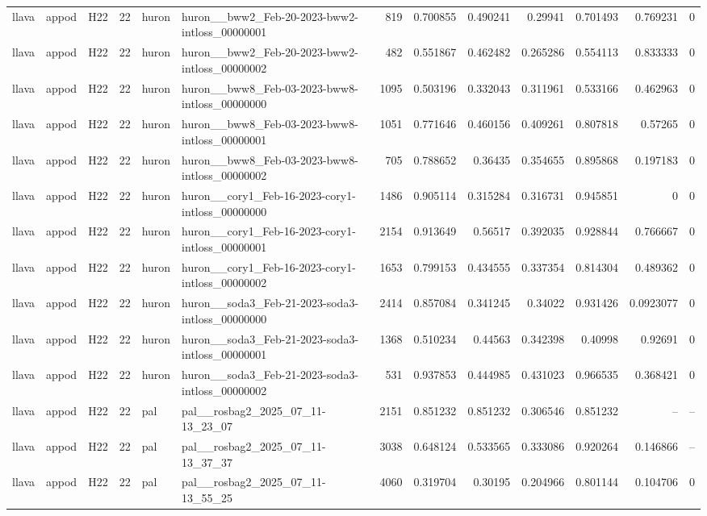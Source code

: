 \begin{longtable}{lllrllrrrrrrr}
llava & appod & H22 & 22 & huron & huron\_\_bww2\_Feb-20-2023-bww2-intloss\_00000001 & 819 & 0.700855 & 0.490241 & 0.29941 & 0.701493 & 0.769231 & 0 \\
llava & appod & H22 & 22 & huron & huron\_\_bww2\_Feb-20-2023-bww2-intloss\_00000002 & 482 & 0.551867 & 0.462482 & 0.265286 & 0.554113 & 0.833333 & 0 \\
llava & appod & H22 & 22 & huron & huron\_\_bww8\_Feb-03-2023-bww8-intloss\_00000000 & 1095 & 0.503196 & 0.332043 & 0.311961 & 0.533166 & 0.462963 & 0 \\
llava & appod & H22 & 22 & huron & huron\_\_bww8\_Feb-03-2023-bww8-intloss\_00000001 & 1051 & 0.771646 & 0.460156 & 0.409261 & 0.807818 & 0.57265 & 0 \\
llava & appod & H22 & 22 & huron & huron\_\_bww8\_Feb-03-2023-bww8-intloss\_00000002 & 705 & 0.788652 & 0.36435 & 0.354655 & 0.895868 & 0.197183 & 0 \\
llava & appod & H22 & 22 & huron & huron\_\_cory1\_Feb-16-2023-cory1-intloss\_00000000 & 1486 & 0.905114 & 0.315284 & 0.316731 & 0.945851 & 0 & 0 \\
llava & appod & H22 & 22 & huron & huron\_\_cory1\_Feb-16-2023-cory1-intloss\_00000001 & 2154 & 0.913649 & 0.56517 & 0.392035 & 0.928844 & 0.766667 & 0 \\
llava & appod & H22 & 22 & huron & huron\_\_cory1\_Feb-16-2023-cory1-intloss\_00000002 & 1653 & 0.799153 & 0.434555 & 0.337354 & 0.814304 & 0.489362 & 0 \\
llava & appod & H22 & 22 & huron & huron\_\_soda3\_Feb-21-2023-soda3-intloss\_00000000 & 2414 & 0.857084 & 0.341245 & 0.34022 & 0.931426 & 0.0923077 & 0 \\
llava & appod & H22 & 22 & huron & huron\_\_soda3\_Feb-21-2023-soda3-intloss\_00000001 & 1368 & 0.510234 & 0.44563 & 0.342398 & 0.40998 & 0.92691 & 0 \\
llava & appod & H22 & 22 & huron & huron\_\_soda3\_Feb-21-2023-soda3-intloss\_00000002 & 531 & 0.937853 & 0.444985 & 0.431023 & 0.966535 & 0.368421 & 0 \\
llava & appod & H22 & 22 & pal & pal\_\_rosbag2\_2025\_07\_11-13\_23\_07 & 2151 & 0.851232 & 0.851232 & 0.306546 & 0.851232 & -- & -- \\
llava & appod & H22 & 22 & pal & pal\_\_rosbag2\_2025\_07\_11-13\_37\_37 & 3038 & 0.648124 & 0.533565 & 0.333086 & 0.920264 & 0.146866 & -- \\
llava & appod & H22 & 22 & pal & pal\_\_rosbag2\_2025\_07\_11-13\_55\_25 & 4060 & 0.319704 & 0.30195 & 0.204966 & 0.801144 & 0.104706 & 0 \\

\end{longtable}
